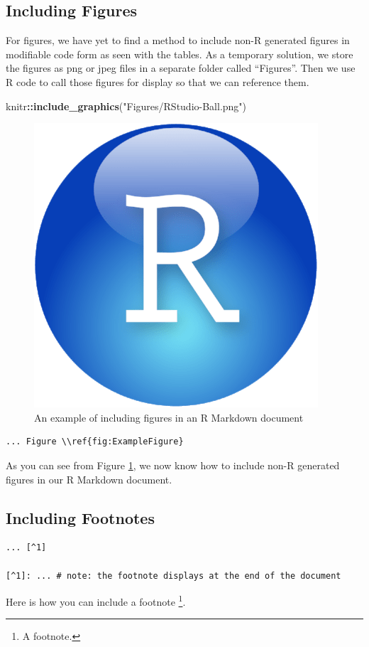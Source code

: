 \documentclass[]{book}
\newenvironment{Shaded}{\begin{snugshade}}{\end{snugshade}}
\newcommand{\KeywordTok}[1]{\textcolor[rgb]{0.13,0.29,0.53}{\textbf{#1}}}
\newcommand{\StringTok}[1]{\textcolor[rgb]{0.31,0.60,0.02}{#1}}
\newcommand{\OperatorTok}[1]{\textcolor[rgb]{0.81,0.36,0.00}{\textbf{#1}}}
\newcommand{\NormalTok}[1]{#1}
\let\rmarkdownfootnote\footnote%
\def\footnote{\protect\rmarkdownfootnote}
\theoremstyle{definition}
\theoremstyle{definition}
\theoremstyle{definition}
\theoremstyle{remark}
\begin{document}
\subsection{Including Figures}\label{including-figures}

For figures, we have yet to find a method to include non-R generated
figures in modifiable code form as seen with the tables. As a temporary
solution, we store the figures as png or jpeg files in a separate folder
called ``Figures''. Then we use R code to call those figures for display
so that we can reference them.

\begin{Shaded}
\begin{Highlighting}[]
\NormalTok{knitr}\OperatorTok{::}\KeywordTok{include_graphics}\NormalTok{(}\StringTok{"Figures/RStudio-Ball.png"}\NormalTok{)}
\end{Highlighting}
\end{Shaded}

\begin{figure}

{\centering \includegraphics[width=0.05\linewidth]{Figures/RStudio-Ball} 

}

\caption{An example of including figures in an R Markdown document}\label{fig:ExampleFigure}
\end{figure}

\begin{verbatim}
... Figure \\ref{fig:ExampleFigure}
\end{verbatim}

As you can see from Figure \ref{fig:ExampleFigure}, we now know how to
include non-R generated figures in our R Markdown document.

\subsection{Including Footnotes}\label{including-footnotes}

\begin{verbatim}
... [^1]

[^1]: ... # note: the footnote displays at the end of the document
\end{verbatim}

Here is how you can include a footnote \footnote{A footnote.}.
\end{document}
